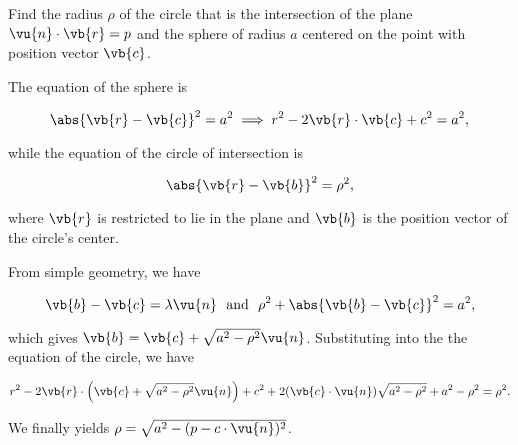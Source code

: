\documentclass[a4paper,12pt]{report}
\begin{document}
{Find the radius \(\rho \) of the circle that is the intersection of the plane \(\vu{n} \cdot \vb{r} = p\) and the sphere of radius \(a\) centered on the point with position vector \(\vb{c} \).}
{The equation of the sphere is 

\begin{equation}
    \abs{\vb{r} - \vb{c} }^2= a^2 \implies r^2 - 2\vb{r} \cdot \vb{c} +c^2= a^2, 
\end{equation}
    
while the equation of the circle of intersection is 

\begin{equation}
    \abs{\vb{r} - \vb{b} }^2 = \rho ^2, 
\end{equation}

where \(\vb{r} \) is restricted to lie in the plane and \(\vb{b} \) is the position vector of the circle's center.

From simple geometry, we have

\begin{equation}
    \vb{b} - \vb{c} = \lambda \vu{n} ~\text { and }~ \rho ^2 + \abs{\vb{b} -\vb{c} }^2 = a^2, 
\end{equation}

which gives \(\vb{b} = \vb{c} + \sqrt{a^2-\rho ^2}\vu{n}  \). Substituting into the the equation of the circle, we have

\begin{equation}
    r^2- 2\vb{r} \cdot \left( \vb{c} + \sqrt{a^2- \rho ^2} \vu{n}  \right) + c^2 + 2(\vb{c} \cdot \vu{n} )\sqrt{a^2-\rho ^2}+a^2-\rho ^2 = \rho ^2.
\end{equation}

We finally yields \(\rho = \sqrt{a^2- (p-c \cdot \vu{n} )^2} \). 

} 
\end{document}
